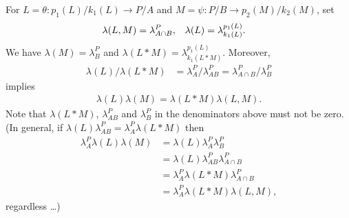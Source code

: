 \documentclass[12pt,a4paper]{amsart}
\begin{document}
For $L = \theta \colon p_1(L)/k_1(L) \to P/A$
and $M = \psi \colon P/B \to p_2(M)/k_2(M)$, set
\begin{align*}
  \lambda(L, M) &= \lambda^P_{A \cap B}, &
  \lambda(L) &= \lambda^{p_1(L)}_{k_1(L)}\text.
\end{align*}
We have $\lambda(M) = \lambda^P_B$ and $\lambda(L * M) = \lambda^{p_1(L)}_{k_1(L*M)}$.
Moreover,
\begin{align*}
  \lambda(L) / \lambda(L * M) &= \lambda^P_A / \lambda^P_{AB} = \lambda^P_{A \cap B} / \lambda^P_B
\end{align*}
implies
\begin{align*}
  \lambda(L) \lambda(M)
  = \lambda(L * M) \lambda(L, M).
\end{align*}
Note that $\lambda(L * M)$, $\lambda^P_{AB}$ and $\lambda^P_B$ in the denominators above
must not be zero.
(In general, if $\lambda(L) \lambda^P_{AB} = \lambda^P_A \lambda(L * M)$ then
\begin{align*}
  \lambda^P_A \lambda(L) \lambda(M)
  &=   \lambda(L) \lambda^P_A \lambda^P_B \\
  &=   \lambda(L) \lambda^P_{AB} \lambda^P_{A \cap B} \\
  &=   \lambda^P_A \lambda(L * M) \lambda^P_{A \cap B} \\
  &=   \lambda^P_A \lambda(L * M) \lambda(L, M),
\end{align*}
regardless \ldots)
\end{document}
